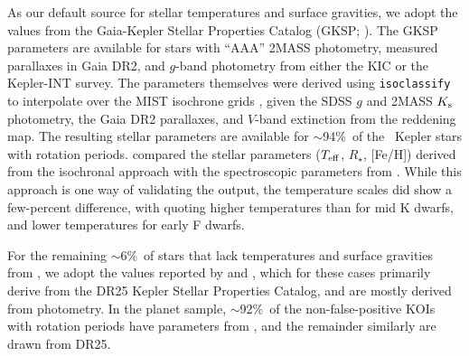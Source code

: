 \documentclass[11pt,twocolumn,tighten]{aastex63}
\newcommand{\fracstarswithprotwithbtwenty}{{$\sim$94\%}}
\newcommand{\fracstarswithprotwithoutbtwenty}{{$\sim$6\%}}
\newcommand{\frackoisnofpwithprotwithbtwenty}{{$\sim$92\%}}
\begin{document}
As our default source for stellar temperatures and surface gravities,
we adopt the values from the Gaia-Kepler Stellar Properties Catalog
(GKSP; \citealt{Berger_2020a_catalog}).  The GKSP parameters are
available for stars with ``AAA'' 2MASS photometry, measured parallaxes
in Gaia DR2,  and $g$-band photometry from either the KIC or the
Kepler-INT survey.  The parameters themselves were derived using
\texttt{isoclassify} \citep{2017ApJ...844..102H} to interpolate over
the MIST isochrone grids
\citep{2016ApJ...823..102C,2016ApJS..222....8D}, given the SDSS $g$
and 2MASS $K_{\rm s}$ photometry, the Gaia DR2 parallaxes, and
$V$-band extinction from the \citet{2018MNRAS.478..651G} reddening
map.  The resulting stellar parameters are available for
\fracstarswithprotwithbtwenty\ of the \nuniqstarsantosrot\ Kepler
stars with rotation periods.
\citet{David_2021} compared the stellar parameters ($T_{\rm eff}$,
$R_\star$, [Fe/H]) derived from the \citet{Berger_2020a_catalog}
isochronal approach with the spectroscopic parameters from
\citet{Fulton_2018}.  While this approach is one way of validating the
\citet{Berger_2020a_catalog} output, the temperature scales did show a
few-percent difference, with  quoting higher
temperatures than  for mid K dwarfs,
and lower temperatures for early F dwarfs.



For the remaining \fracstarswithprotwithoutbtwenty\ of stars that lack
temperatures and surface gravities from
, we adopt the values reported by
\citet{Santos_2019} and \citet{Santos_2021}, which for these cases
primarily derive from the \citet{Mathur_2017} DR25 Kepler Stellar
Properties Catalog, and are mostly derived from photometry.  In the
planet sample, \frackoisnofpwithprotwithbtwenty\ of the
non-false-positive KOIs with rotation periods have parameters from
\citet{Berger_2020a_catalog}, and the remainder similarly are drawn
from DR25. 
\end{document}
